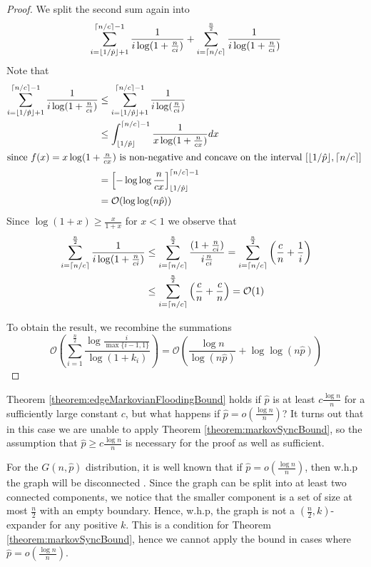\begin{proof}
	We split the second sum again into
	$$	
		\sum_{i=\lfloor1/\hat{p}\rfloor + 1}^{\lceil n/c\rceil-1} \frac{1}{i\log(1+\frac{n}{ci})} 
		+ 
		\sum_{i=\lceil n/c\rceil}^\frac{n}{2} \frac{1}{i\log(1+\frac{n}{ci})} 
	$$
	Note that
	\begin{align*}
		\sum_{i=\lfloor1/\hat{p}\rfloor + 1}^{\lceil n/c\rceil-1} \frac{1}{i\log(1+\frac{n}{ci})} 
		& \leq \sum_{i=\lfloor1/\hat{p}\rfloor + 1}^{\lceil n/c\rceil-1} \frac{1}{i\log(\frac{n}{ci})} \\
		& \leq \int_{\lfloor1/\hat{p}\rfloor}^{\lceil n/c\rceil-1} \frac{1}{x\log(1+\frac{n}{cx})} dx \\
		\intertext{since $f(x) = x\log(1+\frac{n}{cx})$ is non-negative and concave on the interval $[\lfloor1/\hat{p}\rfloor, \lceil n/c\rceil]$ }
		& = \left[-\log\log \frac{n}{cx}\right]_{\lfloor1/\hat{p}\rfloor}^{\lceil n/c\rceil-1} \\
		&= \mathcal{O}(\log \log (n \hat{p}))
	\end{align*}
	Since $\log(1+x) \geq \frac{x}{1+x}$ for $x < 1$ we observe that
	\begin{align*}
		\sum_{i=\lceil n/c\rceil}^\frac{n}{2} \frac{1}{i\log(1+\frac{n}{ci})} 
		& \leq 
		\sum_{i=\lceil n/c\rceil}^\frac{n}{2} \frac{(1 + \frac{n}{ci})}{i\frac{n}{ci}} 
		= 
		\sum_{i=\lceil n/c\rceil}^\frac{n}{2} \left( \frac{c}{n} + \frac{1}{i} \right) \\
		& \leq 
		\sum_{i=\lceil n/c\rceil}^\frac{n}{2} \left( \frac{c}{n} + \frac{c}{n} \right)
		= \mathcal{O}(1)
	\end{align*}

	To obtain the result, we recombine the summations
	$$
		\mathcal{O}\left(\sum_{i=1}^\frac{n}{2} \frac{\log \frac{i}{\max\{i-1,1\}}}{\log(1+k_i)}\right) =
		\mathcal{O}\left(\frac{\log n}{\log (n\hat{p})} + \log \log (n\hat{p})\right)
	$$

\end{proof}

Theorem \ref{theorem:edgeMarkovianFloodingBound} holds if $\hat{p}$ is at least $c \frac{\log n}{n}$ for a sufficiently large constant $c$, but what happens if $\hat{p} = o(\frac{\log n}{n})$? %
It turns out that in this case we are unable to apply Theorem \ref{theorem:markovSyncBound}, so the assumption that $\hat{p} \geq c \frac{\log n}{n}$ is necessary for the proof as well as sufficient.

For the $G(n, \hat{p})$ distribution, it is well known that if $\hat{p} = o(\frac{\log n}{n})$, then w.h.p the graph will be disconnected \cite{complexNetworksRandomGraphs}. Since the graph can be split into at least two connected components, we notice that the smaller component is a set of size at most $\frac{n}{2}$ with an empty boundary. Hence, w.h.p, the graph is not a $(\frac{n}{2}, k)$-expander for any positive $k$. This is a condition for Theorem \ref{theorem:markovSyncBound}, hence we cannot apply the bound in cases where $\hat{p} = o(\frac{\log n}{n})$.

